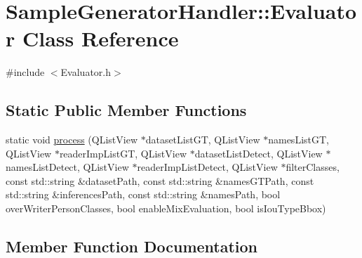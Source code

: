\hypertarget{class_sample_generator_handler_1_1_evaluator}{}\section{Sample\+Generator\+Handler\+:\+:Evaluator Class Reference}
\label{class_sample_generator_handler_1_1_evaluator}


{\ttfamily \#include $<$Evaluator.\+h$>$}

\subsection*{Static Public Member Functions}
\begin{DoxyCompactItemize}
\item 
static void \hyperlink{class_sample_generator_handler_1_1_evaluator_aea0f0fd9a50055382e4c44f45f61c4f0}{process} (Q\+List\+View $\ast$dataset\+List\+GT, Q\+List\+View $\ast$names\+List\+GT, Q\+List\+View $\ast$reader\+Imp\+List\+GT, Q\+List\+View $\ast$dataset\+List\+Detect, Q\+List\+View $\ast$names\+List\+Detect, Q\+List\+View $\ast$reader\+Imp\+List\+Detect, Q\+List\+View $\ast$filter\+Classes, const std\+::string \&dataset\+Path, const std\+::string \&names\+G\+T\+Path, const std\+::string \&inferences\+Path, const std\+::string \&names\+Path, bool over\+Writer\+Person\+Classes, bool enable\+Mix\+Evaluation, bool is\+Iou\+Type\+Bbox)
\end{DoxyCompactItemize}


\subsection{Member Function Documentation}
\mbox{\label{class_sample_generator_handler_1_1_evaluator_aea0f0fd9a50055382e4c44f45f61c4f0}} 
